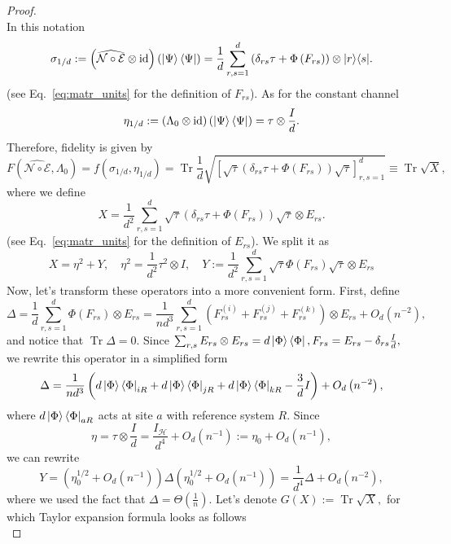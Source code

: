 \documentclass[11pt,letterpaper]{article}
\theoremstyle{plain}
\theoremstyle{plain}
\theoremstyle{plain}
\theoremstyle{plain}
\theoremstyle{plain}
\theoremstyle{plain}
\theoremstyle{plain}
\theoremstyle{definition}
\theoremstyle{plain}
\begin{document}
\begin{proof}
\[    \]
    In this notation 
    \[
        \sigma_{1/d}:=\left(\widehat{\mathcal{N} \circ \mathcal{E}} \otimes \operatorname{id}\right)\left(\ket{\Psi}\bra{\Psi}\right)=\frac{1}{d}\sum_{r,s=1}^d \left(\delta_{r s} \tau+\Phi\left(F_{r s}\right)\right) \otimes|r\rangle\langle s| .
    \]
    (see Eq.~\eqref{eq:matr_units} for the definition of $F_{r s}$). As for the constant channel
    \[
        \eta_{1/d}:=\left(\Lambda_0 \otimes \mathrm{id}\right)\left(\ket{\Psi}\bra{\Psi}\right)=\tau \otimes \frac{I}{d}.
    \]
    Therefore, fidelity is given by
    \[
        F(\widehat{\mathcal{N} \circ \mathcal{E}}, \Lambda_0)=f(\sigma_{1/d}, \eta_{1/d})=\operatorname{Tr} \frac{1}{d}\sqrt{\left[\sqrt{\tau}\left(\delta_{r s} \tau+\Phi\left(F_{r s}\right)\right) \sqrt{\tau} \right]_{r, s=1}^d}\equiv \operatorname{Tr} \sqrt{X},
    \] 
    where we define
    \[
        X=\frac{1}{d^2} \sum_{r, s=1}^d \sqrt{\tau}\left(\delta_{r s} \tau+\Phi\left(F_{r s}\right)\right) \sqrt{\tau} \otimes E_{r s}.
    \]
    (see Eq.~\eqref{eq:matr_units} for the definition of $E_{r s}$). We split it as
    \[
        X=\eta^2+Y, \quad \eta^2=\frac{1}{d^2} \tau^2 \otimes I, \quad Y:=\frac{1}{d^2} \sum_{r, s=1}^d \sqrt{\tau} \Phi\left(F_{r s}\right) \sqrt{\tau} \otimes E_{r s}
    \]
    Now, let's transform these operators into a more convenient form. First, define
    \[
        \Delta=\frac{1}{d} \sum_{r, s=1}^d \Phi\left(F_{r s}\right) \otimes E_{r s}=\frac{1}{n d^3} \sum_{r, s=1}^d\left(F_{r s}^{(i)}+F_{r s}^{(j)}+F_{r s}^{(k)}\right) \otimes E_{r s}+O_{d}\left(n^{-2}\right),
    \]
    and notice that $\operatorname{Tr} \Delta=0$. Since
    $
        \sum_{r, s} E_{r s} \otimes E_{r s}=d\ket{\Phi}\bra{\Phi}, F_{r s}=E_{r s}-\delta_{r s} \frac{I}{d},
    $
    we rewrite this operator in a simplified form
    \[
        \Delta=\frac{1}{n d^3}\left(d\ket{\Phi}\bra{\Phi}_{i R}+d\ket{\Phi}\bra{\Phi}_{j R}+d\ket{\Phi}\bra{\Phi}_{k R}-\frac{3}{d} I\right)+O_{d}\left(n^{-2}\right),
    \]
    where $d\ket{\Phi}\bra{\Phi}_{a R}$ acts at site $a$ with reference system $R$. 
    Since
    \[
        \eta=\tau \otimes \frac{I}{d}=\frac{I_{\mathcal{H}}}{d^4}+O_{d}\left(n^{-1}\right):=\eta_0+O_{d}\left(n^{-1}\right),
    \]
    we can rewrite
    \[
        Y=(\eta_0^{1 / 2}+O_{d}\left(n^{-1}\right))\Delta(\eta_0^{1 / 2}+O_{d}\left(n^{-1}\right))=\frac{1}{d^4} \Delta+O_{d}\left(n^{-2}\right),
    \]
    where we used the fact that $\Delta=\Theta(\frac{1}{n})$.
    Let's denote
    $
        G(X):=\operatorname{Tr} \sqrt{X},
    $
    for which Taylor expansion formula looks as follows
    \[
\]
\end{proof}
\end{document}
